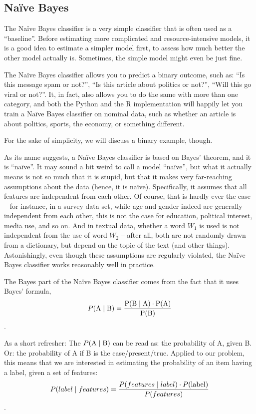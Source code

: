 \subsection{Na\"ive Bayes}
\label{subsec:Na\"ive Bayes}

The Na\"ive Bayes classifier is a very simple classifier that is often
used as a ``baseline''. Before estimating more complicated and
resource-intensive models, it is a good idea to estimate a simpler
model first, to assess how much better the other model actually
is. Sometimes, the simple model might even be just fine.

The Na\"ive Bayes classifier allows you to predict a binary outcome,
such as: ``Is this message spam or not?'', ``Is this article about
politics or not?'', ``Will this go viral or not?''.  It, in fact, also
allows you to do the same with more than one category, and both the
Python and the R implementation will happily let you train a Na\"ive
Bayes classifier on nominal data, such as whether an article is about
politics, sports, the economy, or something different.

For the sake of simplicity, we will discuss a binary example, though.

As its name suggests, a Na\"ive Bayes classifier is based on Bayes'
theorem, and it is ``na\"ive''.  It may sound a bit weird to call a
model ``na\"ive'', but what it actually means is not so much that it
is stupid, but that it makes very far-reaching assumptions about the
data (hence, it is na\"ive). Specifically, it assumes that all
features are independent from each other.  Of course, that is hardly
ever the case -- for instance, in a survey data set, while age and
gender indeed are generally independent from each other, this is not the case for education, political interest,
media use, and so on.  And in textual data, whether a word $W_1$ is used
is not independent from the use of word $W_2$ -- after all, both are not
randomly drawn from a dictionary, but depend on the topic of the text
(and other things).  Astonishingly, even though these assumptions are
regularly violated, the Na\"ive Bayes classifier works reasonably well
in practice.

The Bayes part of the Na\"ive Bayes classifier comes from the fact
that it uses Bayes' formula, $$ P(\rm{A} \mid \rm{B}) = \frac{P(\rm{B} \mid \rm{A}) \cdot P(\rm{A})}{P(\rm {B})} $$.

As a short refresher: The $P(\rm{A} \mid \rm{B})$ can be read as: the
probability of A, given B. Or: the probability of A if B is the
case/present/true.  Applied to our problem, this means that we are
interested in estimating the probability of an item having a label,
given a set of features:
$$ P(label \mid features) = \frac{P(features \mid label) \cdot P(\rm{label})}{P(features)} $$.


